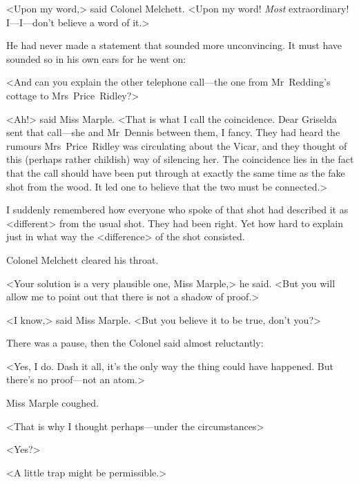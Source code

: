 <Upon my word,> said Colonel Melchett. <Upon my word! \emph{Most} extraordinary! I—I—don't believe a word of it.>

He had never made a statement that sounded more unconvincing. It must have sounded so in his own ears for he went on:

<And can you explain the other telephone call—the one from Mr~Redding's cottage to Mrs~Price~Ridley?>

<Ah!> said Miss Marple. <That is what I call the coincidence. Dear Griselda sent that call—she and Mr~Dennis between them, I fancy. They had heard the rumours Mrs~Price~Ridley was circulating about the Vicar, and they thought of this (perhaps rather childish) way of silencing her. The coincidence lies in the fact that the call should have been put through at exactly the same time as the fake shot from the wood. It led one to believe that the two must be connected.>

I suddenly remembered how everyone who spoke of that shot had described it as <different> from the usual shot. They had been right. Yet how hard to explain just in what way the <difference> of the shot consisted.

Colonel Melchett cleared his throat.

<Your solution is a very plausible one, Miss Marple,> he said. <But you will allow me to point out that there is not a shadow of proof.>

<I know,> said Miss Marple. <But you believe it to be true, don't you?>

There was a pause, then the Colonel said almost reluctantly:

<Yes, I do. Dash it all, it's the only way the thing could have happened. But there's no proof—not an atom.>

Miss Marple coughed.

<That is why I thought perhaps—under the circumstances\longdash>

<Yes?>

<A little trap might be permissible.>